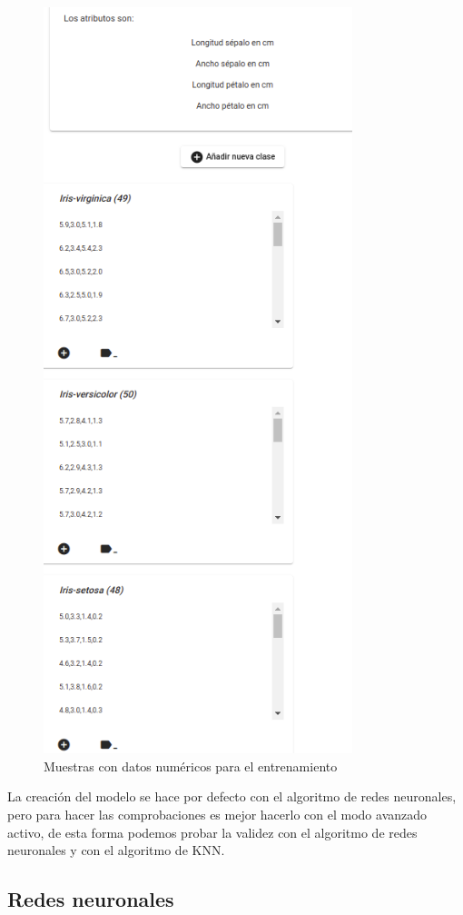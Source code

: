 \documentclass[a4paper, 12pt]{book}
\begin{document}
\begin{figure}
	\centering
	\includegraphics[width=9cm, keepaspectratio]{img/ejemplo_muestras_num.png}
	\caption{Muestras con datos numéricos para el entrenamiento} 	\label{fig:ejemplo3}
\end{figure}

La creación del modelo se hace por defecto con el algoritmo de redes neuronales, pero para hacer las comprobaciones es mejor hacerlo con el modo avanzado activo, de esta forma podemos probar la validez con el algoritmo de redes neuronales y con el algoritmo de KNN.

\subsection{Redes neuronales}
\label{subsec:redesneuronales}
\end{document}
